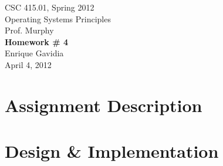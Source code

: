 \documentclass[12pt]{article}
\def \name       {Enrique Gavidia}
\def \coursenum  {CSC 415.01}
\def \coursename {Operating Systems Principles}
\def \instructor {Prof. Murphy}
\def \semester   {Spring 2012}
\def \assignment {Homework \# 4}
\def \duedate    {April 4, 2012}
\newcommand {\makecover} {
  \begin{titlepage}
    \begin{center}
      \LARGE{\coursenum, \semester \\ \coursename}\\
      \Large{\instructor}\\
      \vfill
      \textbf{\Huge \assignment}\\
      \vfill
      \Large{\name}\\
      \large{\duedate}
    \end{center}
  \end{titlepage}
}
\begin{document}
\makecover

\section*{Assignment Description}


%

\section*{Design \& Implementation}

\end{document}
